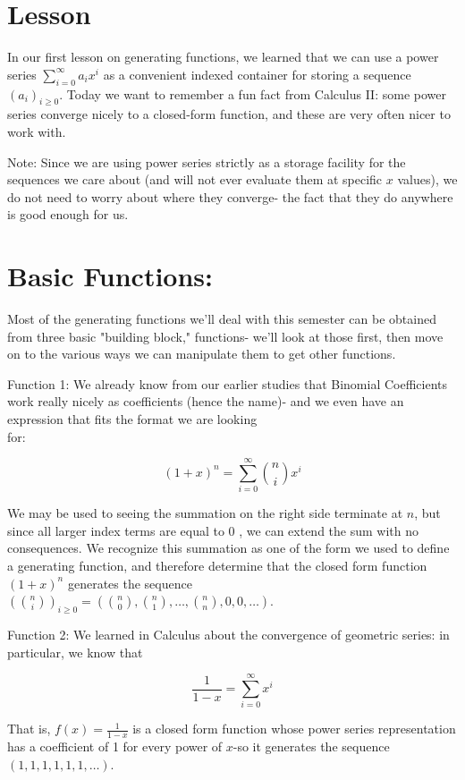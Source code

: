 \documentclass{article}
\begin{document}
\section*{Lesson}
In our first lesson on generating functions, we learned that we can use a power series $\sum_{i=0}^{\infty} a_{i} x^{i}$ as a convenient indexed container for storing a sequence $\left(a_{i}\right)_{i \geq 0}$. Today we want to remember a fun fact from Calculus II: some power series converge nicely to a closed-form function, and these are very often nicer to work with.

Note: Since we are using power series strictly as a storage facility for the sequences we care about (and will not ever evaluate them at specific $x$ values), we do not need to worry about where they converge- the fact that they do anywhere is good enough for us.

\section*{Basic Functions:}
Most of the generating functions we'll deal with this semester can be obtained from three basic "building block," functions- we'll look at those first, then move on to the various ways we can manipulate them to get other functions.

Function 1: We already know from our earlier studies that Binomial Coefficients work really nicely as coefficients (hence the name)- and we even have an expression that fits the format we are looking\\
for:

$$
(1+x)^{n}=\sum_{i=0}^{\infty}\binom{n}{i} x^{i}
$$

We may be used to seeing the summation on the right side terminate at $n$, but since all larger index terms are equal to 0 , we can extend the sum with no consequences. We recognize this summation as one of the form we used to define a generating function, and therefore determine that the closed form function $(1+x)^{n}$ generates the sequence $\left(\binom{n}{i}\right)_{i \geq 0}=\left(\binom{n}{0},\binom{n}{1}, \ldots,\binom{n}{n}, 0,0, \ldots\right)$.

Function 2: We learned in Calculus about the convergence of geometric series: in particular, we know that

$$
\frac{1}{1-x}=\sum_{i=0}^{\infty} x^{i}
$$

That is, $f(x)=\frac{1}{1-x}$ is a closed form function whose power series representation has a coefficient of 1 for every power of $x$-so it generates the sequence $(1,1,1,1,1,1, \ldots)$.
\end{document}

